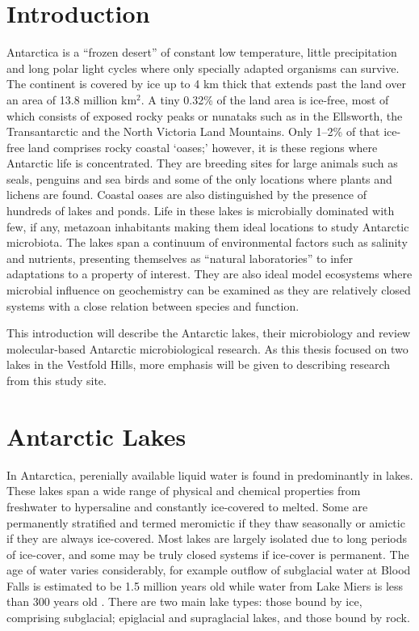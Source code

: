 \section{Introduction}
Antarctica is a ``frozen desert'' of constant low temperature, little precipitation and long polar light cycles where only specially adapted organisms can survive.
The continent is covered by ice up to 4 km thick that extends past the land over an area of 13.8 million km$^2$. %
A tiny 0.32\% of the land area is ice-free, most of which consists of exposed rocky peaks or nunataks such as in the Ellsworth, the Transantarctic and the North Victoria Land Mountains. %
Only 1--2\% of that ice-free land comprises rocky coastal `oases;' however, it is these regions where Antarctic life is concentrated\cite{Hodgeson2012}.
They are breeding sites for large animals such as seals, penguins and sea birds and some of the only locations where plants and lichens are found.
Coastal oases are also distinguished by the presence of hundreds of lakes and ponds.
Life in these lakes is microbially dominated with few, if any, metazoan inhabitants \cite{Laybourne-Parry1997} making them ideal locations to study Antarctic microbiota. 
The lakes span a continuum of environmental factors such as salinity and nutrients, presenting themselves as ``natural laboratories'' to infer adaptations to a property of interest. 
They are also ideal model ecosystems where microbial influence on geochemistry can be examined as they are relatively closed systems with a close relation between species and function.

This introduction will describe the Antarctic lakes, their microbiology and review molecular-based Antarctic microbiological research.
As this thesis focused on two lakes in the Vestfold Hills, more emphasis will be given to describing research from this study site.


\section{Antarctic Lakes}
In Antarctica, perenially available liquid water is found in predominantly in lakes. 
These lakes span a wide range of physical and chemical properties from freshwater to hypersaline and constantly ice-covered to melted.
Some are permanently stratified and termed meromictic if they thaw seasonally or amictic if they are always ice-covered.
Most lakes are largely isolated due to long periods of ice-cover, and some may be truly closed systems if ice-cover is permanent.
The age of water varies considerably, for example outflow of subglacial water at Blood Falls is estimated to be 1.5 million years old \cite{Mickucki2009} while water from Lake Miers is less than 300 years old \cite{Green1988}. 
There are two main lake types: those bound by ice, comprising subglacial; epiglacial and supraglacial lakes, and those bound by rock.

